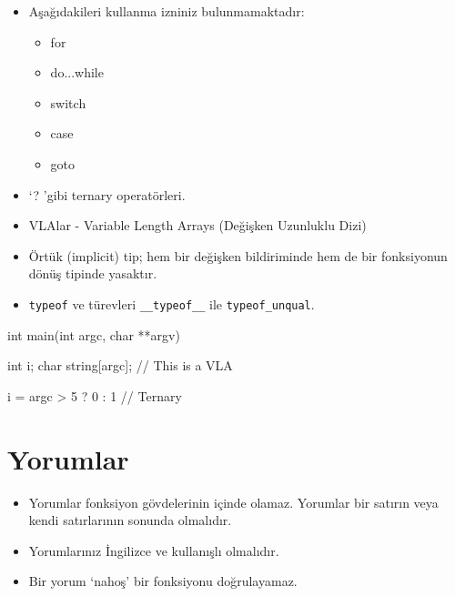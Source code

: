 \documentclass{42-en}
\begin{document}
        \begin{itemize}

            \item Aşağıdakileri kullanma izniniz bulunmamaktadır:

                \begin{itemize}

                    \item for
                    \item do...while
                    \item switch
                    \item case
                    \item goto

                \end{itemize}

            \item ‘? ’gibi ternary operatörleri.

            \item VLAlar - Variable Length Arrays (Değişken Uzunluklu Dizi)

            \item Örtük (implicit) tip; hem bir değişken bildiriminde hem de bir fonksiyonun dönüş
tipinde yasaktır.

            \item \texttt{typeof} ve türevleri \texttt{\_\_typeof\_\_} ile
            \texttt{typeof\_unqual}.

        \end{itemize}
        \begin{42ccode}
    int main(int argc, char **argv)
    {
        int     i;
        char    string[argc]; // This is a VLA

        i = argc > 5 ? 0 : 1 // Ternary
    }
        \end{42ccode}
        \newpage

    \section{Yorumlar}

        \begin{itemize}

            \item Yorumlar fonksiyon gövdelerinin içinde olamaz. Yorumlar bir satırın veya kendi satırlarının sonunda olmalıdır.

            \item Yorumlarınız İngilizce ve kullanışlı olmalıdır.

            \item Bir yorum ‘nahoş’ bir fonksiyonu doğrulayamaz.

        \end{itemize}
        \newpage
\end{document}
